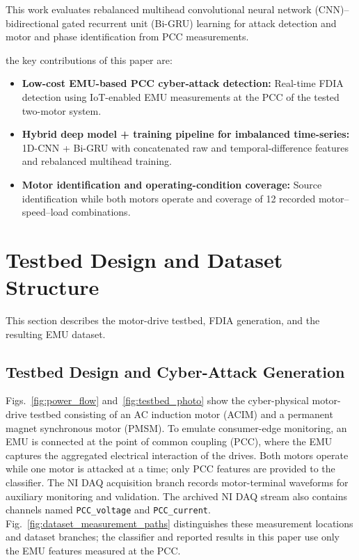 \documentclass[conference]{IEEEtran}
\begin{document}
This work evaluates rebalanced multihead convolutional neural network (CNN)--bidirectional gated recurrent unit (Bi-GRU) learning for attack detection and motor and phase identification from PCC measurements.

the key contributions of this paper are:
\begin{itemize}
    \item \textbf{Low-cost EMU-based PCC cyber-attack detection:} Real-time FDIA detection using IoT-enabled EMU measurements at the PCC of the tested two-motor system.
    \item \textbf{Hybrid deep model + training pipeline for imbalanced time-series:} 1D-CNN + Bi-GRU with concatenated raw and temporal-difference features and rebalanced multihead training.
    \item \textbf{Motor identification and operating-condition coverage:} Source identification while both motors operate and coverage of 12 recorded motor--speed--load combinations.
\end{itemize}




\section{Testbed Design and Dataset Structure}
This section describes the motor-drive testbed, FDIA generation, and the resulting EMU dataset.

\subsection{Testbed Design and Cyber-Attack Generation}

Figs.~\ref{fig:power_flow} and~\ref{fig:testbed_photo} show the cyber-physical motor-drive testbed consisting of an AC induction motor (ACIM)  and a permanent magnet synchronous motor (PMSM). To emulate consumer-edge monitoring, an EMU is connected at the point of common coupling (PCC), where the EMU captures the aggregated electrical interaction of the drives. Both motors operate while one motor is attacked at a time; only PCC features are provided to the classifier.
The NI DAQ acquisition branch records motor-terminal waveforms for auxiliary monitoring and validation. The archived NI DAQ stream also contains channels named \texttt{PCC\_voltage} and \texttt{PCC\_current}. Fig.~\ref{fig:dataset_measurement_paths} distinguishes these measurement locations and dataset branches; the classifier and reported results in this paper use only the EMU features measured at the PCC.
\end{document}
